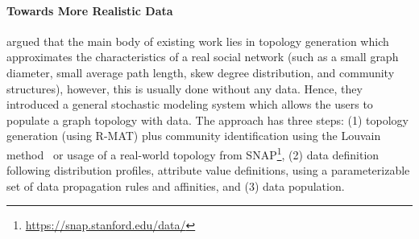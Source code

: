 
\paragraph{Towards More Realistic Data} \cite{Nettleton2016} argued that the main body of existing work lies in
topology generation which approximates the characteristics of a real social
network (such as a small graph diameter, small average path length, skew degree
distribution, and community structures), however,  this is usually done without any data. Hence, they
introduced a general stochastic modeling system which allows the users to
populate a graph topology with data. The approach has three steps: (1) topology
generation (using R-MAT) plus community identification using the Louvain
method~\cite{1742-5468-2008-10-P10008} or usage of a real-world topology from
SNAP\footnote{\url{https://snap.stanford.edu/data/}}, (2) data definition
following distribution profiles, attribute value definitions, using a
parameterizable set of data propagation rules and affinities, and (3) data
population.


